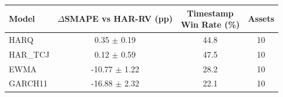 \begin{tabular}{|l|c|c|c|}
\hline
Model & \shortstack{$\Delta$SMAPE\\vs HAR-RV (pp)} & \shortstack{Timestamp\\Win Rate (\%)} & Assets \\
\hline
HARQ & 0.35 $\pm$ 0.19 & 44.8 & 10 \\
HAR\_TCJ & 0.12 $\pm$ 0.59 & 47.5 & 10 \\
EWMA & -10.77 $\pm$ 1.22 & 28.2 & 10 \\
GARCH11 & -16.88 $\pm$ 2.32 & 22.1 & 10 \\
\hline
\end{tabular}
